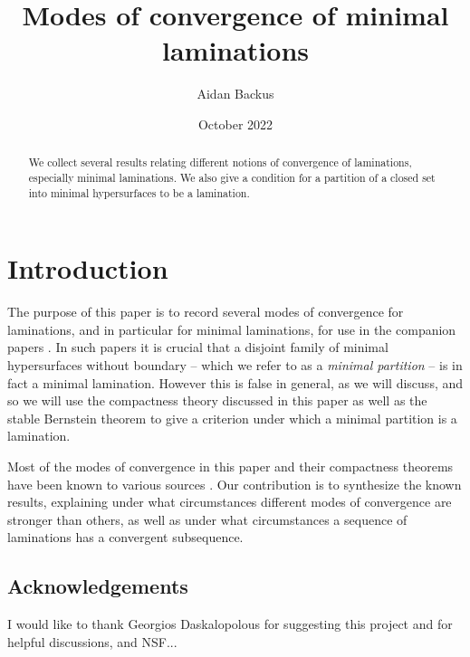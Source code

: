 \documentclass[reqno,10pt]{amsart}
\title{Modes of convergence of minimal laminations}
\author{Aidan Backus}
\date{October 2022}
\newcommand{\dfn}[1]{\emph{#1}\index{#1}}
\theoremstyle{definition}
\numberwithin{equation}{section}
\begin{document}
\begin{abstract}
We collect several results relating different notions of convergence of laminations, especially minimal laminations.
We also give a condition for a partition of a closed set into minimal hypersurfaces to be a lamination.
\end{abstract}

\maketitle



\section{Introduction}
The purpose of this paper is to record several modes of convergence for laminations, and in particular for minimal laminations, for use in the companion papers \cite{BackusFLG, DaskalopoulosPrep2}.
In such papers it is crucial that a disjoint family of minimal hypersurfaces without boundary -- which we refer to as a \dfn{minimal partition} -- is in fact a minimal lamination.
However this is false in general, as we will discuss, and so we will use the compactness theory discussed in this paper as well as the stable Bernstein theorem \cite{Schoen2016, Chodosh2021} to give a criterion under which a minimal partition is a lamination.

Most of the modes of convergence in this paper and their compactness theorems have been known to various sources \cite{ColdingMinicozziIV, ColdingMinicozziV, thurston1979geometry}.
Our contribution is to synthesize the known results, explaining under what circumstances different modes of convergence are stronger than others, as well as under what circumstances a sequence of laminations has a convergent subsequence.


\subsection{Acknowledgements}
I would like to thank Georgios Daskalopolous for suggesting this project and for helpful discussions, and NSF...

\end{document}
